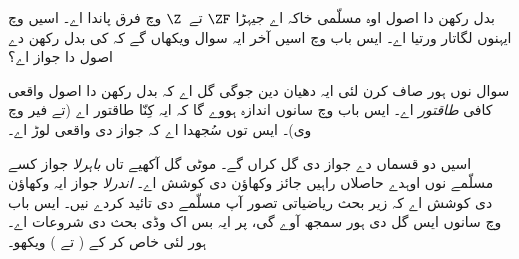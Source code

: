 \documentclass[../../../include/open-logic-section]{subfiles}
\begin{document}

بدل رکھن دا اصول اوہ مسلّمی خاکہ اے جیہڑا $\ZF$ تے~$\Z$ وچ فرق
پاندا اے۔ اسیں  وچ
ایہنوں لگاتار ورتیا اے۔ ایس باب وچ اسیں آخر ایہ سوال ویکھاں گے کہ
کی بدل رکھن دے اصول دا جواز اے؟

سوال نوں ہور صاف کرن لئی ایہ دھیان دین جوگی گل اے کہ بدل رکھن دا اصول
واقعی کافی \emph{طاقتور} اے۔ ایس باب وچ سانوں اندازہ ہووے گا کہ ایہ کِنّا
طاقتور اے (تے فیر  وچ وی)۔
ایس توں سُجھدا اے کہ جواز دی واقعی لوڑ اے۔

اسیں دو قسماں دے جواز دی گل کراں گے۔ موٹی گل آکھیے تاں \emph{باہرلا}
جواز کسے مسلّمے نوں اوہدے حاصلاں راہیں جائز وکھاؤن دی کوشش اے۔
\emph{اندرلا} جواز ایہ وکھاؤن دی کوشش اے کہ زیر بحث ریاضیاتی تصور آپ
مسلّمے دی تائید کردے نیں۔ ایس باب وچ سانوں ایس گل دی ہور سمجھ آوے گی،
پر ایہ بس اک وڈی بحث دی شروعات اے۔ ہور لئی خاص کر کے
\citeauthor{Maddy1988a} (\citeyear{Maddy1988a} تے \citeyear{Maddy1988b})
ویکھو۔
\end{document}
